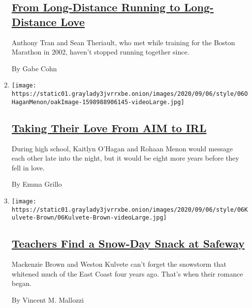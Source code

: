\begin{enumerate}
  \hypertarget{from-long-distance-running-to-long-distance-love}{%
  \subsection{\texorpdfstring{\href{/2020/09/04/style/from-long-distance-running-to-long-distance-love.html}{From
  Long-Distance Running to Long-Distance
  Love}}{From Long-Distance Running to Long-Distance Love}}\label{from-long-distance-running-to-long-distance-love}}

  Anthony Tran and Sean Theriault, who met while training for the Boston
  Marathon in 2002, haven't stopped running together since.

  By Gabe Cohn
\item
  \texttt{[image: https://static01.graylady3jvrrxbe.onion/images/2020/09/06/style/06OHaganMenon/oakImage-1598988906145-videoLarge.jpg]}

  \hypertarget{taking-their-love-from-aim-to-irl}{%
  \subsection{\texorpdfstring{\href{/2020/09/04/style/taking-their-love-from-aim-to-irl.html}{Taking
  Their Love From AIM to
  IRL}}{Taking Their Love From AIM to IRL}}\label{taking-their-love-from-aim-to-irl}}

  During high school, Kaitlyn O'Hagan and Rohaan Menon would message
  each other late into the night, but it would be eight more years
  before they fell in love.

  By Emma Grillo
\item
  \texttt{[image: https://static01.graylady3jvrrxbe.onion/images/2020/09/06/style/06Kulvete-Brown/06Kulvete-Brown-videoLarge.jpg]}

  \hypertarget{teachers-find-a-snow-day-snack-at-safeway}{%
  \subsection{\texorpdfstring{\href{/2020/09/04/fashion/weddings/teachers-find-a-snow-day-snack-at-safeway.html}{Teachers
  Find a Snow-Day Snack at
  Safeway}}{Teachers Find a Snow-Day Snack at Safeway}}\label{teachers-find-a-snow-day-snack-at-safeway}}

  Mackenzie Brown and Weston Kulvete can't forget the snowstorm that
  whitened much of the East Coast four years ago. That's when their
  romance began.

  By Vincent M. Mallozzi
\end{enumerate}

